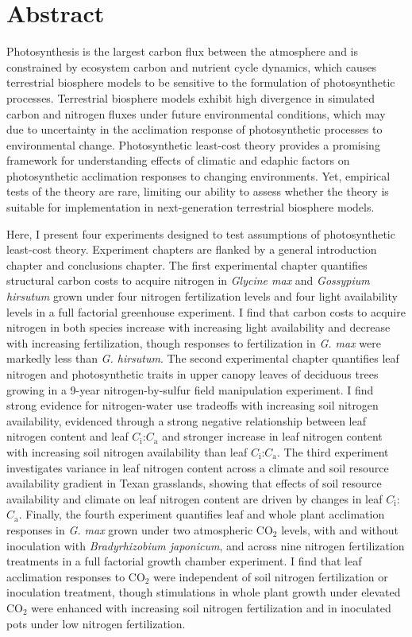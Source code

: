 \documentclass{ttuthes2007}
\begin{document}
\chapter{\textbf{Abstract}}
\noindent Photosynthesis is the largest carbon flux between the atmosphere and is constrained by ecosystem carbon and nutrient cycle dynamics, which causes terrestrial biosphere models to be sensitive to the formulation of photosynthetic processes. Terrestrial biosphere models exhibit high divergence in simulated carbon and nitrogen fluxes under future environmental conditions, which may due to uncertainty in the acclimation response of photosynthetic processes to environmental change. Photosynthetic least-cost theory provides a promising framework for understanding effects of climatic and edaphic factors on photosynthetic acclimation responses to changing environments. Yet, empirical tests of the theory are rare, limiting our ability to assess whether the theory is suitable for implementation in next-generation terrestrial biosphere models.

Here, I present four experiments designed to test assumptions of photosynthetic least-cost theory. Experiment chapters are flanked by a general introduction chapter and conclusions chapter. The first experimental chapter quantifies structural carbon costs to acquire nitrogen in \textit{Glycine max} and \textit{Gossypium hirsutum} grown under four nitrogen fertilization levels and four light availability levels in a full factorial greenhouse experiment. I find that carbon costs to acquire nitrogen in both species increase with increasing light availability and decrease with increasing fertilization, though responses to fertilization in \textit{G. max} were markedly less than \textit{G. hirsutum}. The second experimental chapter quantifies leaf nitrogen and photosynthetic traits in upper canopy leaves of deciduous trees growing in a 9-year nitrogen-by-sulfur field manipulation experiment. I find strong evidence for nitrogen-water use tradeoffs with increasing soil nitrogen availability, evidenced through a strong negative relationship between leaf nitrogen content and leaf $C_\mathrm{i}$:$C_\mathrm{a}$ and stronger increase in leaf nitrogen content with increasing soil nitrogen availability than leaf $C_\mathrm{i}$:$C_\mathrm{a}$. The third experiment investigates variance in leaf nitrogen content across a climate and soil resource availability gradient in Texan grasslands, showing that effects of soil resource availability and climate on leaf nitrogen content are driven by changes in leaf $C_\mathrm{i}$:$C_\mathrm{a}$. Finally, the fourth experiment quantifies leaf and whole plant acclimation responses in \textit{G. max} grown under two atmospheric CO$_2$ levels, with and without inoculation with \textit{Bradyrhizobium japonicum}, and across nine nitrogen fertilization treatments in a full factorial growth chamber experiment. I find that leaf acclimation responses to CO$_2$ were independent of soil nitrogen fertilization or inoculation treatment, though stimulations in whole plant growth under elevated CO$_2$ were enhanced with increasing soil nitrogen fertilization and in inoculated pots under low nitrogen fertilization.
\end{document}
